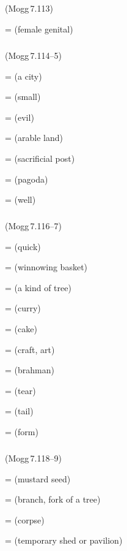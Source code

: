 \subparagraph*{} (Mogg\,7.113)\label{pacckx:ni}

 =  (female genital)\par

\subparagraph*{} (Mogg\,7.114--5)\label{pacckx:pa}

 =  (a city)\par
{} =  (small)\par
{} =  (evil)\par
{} =  (arable land)\par
{} =  (sacrificial post)\par
{} =  (pagoda)\par
{} =  (well)\par

\subparagraph*{} (Mogg\,7.116--7)\label{pacckx:paka}

 =  (quick)\par
{} =  (winnowing basket)\par
{} =  (a kind of tree)\par
{} =  (curry)\par
{} =  (cake)\par
{} =  (craft, art)\par
{} =  (brahman)\par
{} =  (tear)\par
{} =  (tail)\par
{} =  (form)\par

\subparagraph*{} (Mogg\,7.118--9)\label{pacckx:apa}

 =  (mustard seed)\par
{} =  (branch, fork of a tree)\par
{} =  (corpse)\par
{} =  (temporary shed or pavilion)\par

